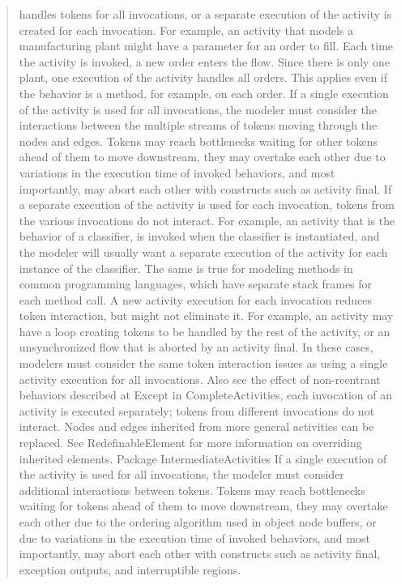 \begin{quotation}
handles tokens for all invocations, or a separate execution of the activity is created for each invocation. For example, an
activity that models a manufacturing plant might have a parameter for an order to fill. Each time the activity is invoked,
a new order enters the flow. Since there is only one plant, one execution of the activity handles all orders. This applies
even if the behavior is a method, for example, on each order. If a single execution of the activity is used for all
invocations, the modeler must consider the interactions between the multiple streams of tokens moving through the nodes
and edges. Tokens may reach bottlenecks waiting for other tokens ahead of them to move downstream, they may overtake
each other due to variations in the execution time of invoked behaviors, and most importantly, may abort each other with
constructs such as activity final.
If a separate execution of the activity is used for each invocation, tokens from the various invocations do not interact. For
example, an activity that is the behavior of a classifier, is invoked when the classifier is instantiated, and the modeler will
usually want a separate execution of the activity for each instance of the classifier. The same is true for modeling methods
in common programming languages, which have separate stack frames for each method call. A new activity execution for
each invocation reduces token interaction, but might not eliminate it. For example, an activity may have a loop creating
tokens to be handled by the rest of the activity, or an unsynchronized flow that is aborted by an activity final. In these
cases, modelers must consider the same token interaction issues as using a single activity execution for all invocations.
Also see the effect of non-reentrant behaviors described at Except in CompleteActivities, each invocation of an activity is
executed separately; tokens from different invocations do not interact.
Nodes and edges inherited from more general activities can be replaced. See RedefinableElement for more information on
overriding inherited elements.
Package IntermediateActivities
If a single execution of the activity is used for all invocations, the modeler must consider additional interactions between
tokens. Tokens may reach bottlenecks waiting for tokens ahead of them to move downstream, they may overtake each
other due to the ordering algorithm used in object node buffers, or due to variations in the execution time of invoked
behaviors, and most importantly, may abort each other with constructs such as activity final, exception outputs, and
interruptible regions.

\end{quotation}
